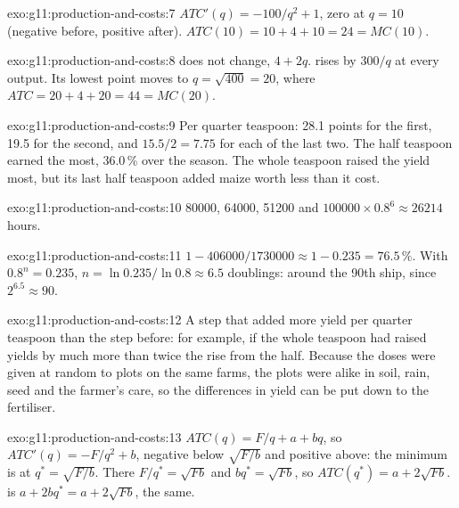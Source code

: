 \begin{solution}{exo:g11:production-and-costs:7}
$\mathit{ATC}'(q) = -100/q^2 + 1$, zero at $q = 10$ (negative before, positive after). $\mathit{ATC}(10) = 10 + 4 + 10 = 24 = \mathit{MC}(10)$.
\end{solution}

\begin{solution}{exo:g11:production-and-costs:8}
 does not change, $4 + 2q$.  rises by $300/q$ at every output. Its lowest point moves to $q = \sqrt{400} = 20$, where $\mathit{ATC} = 20 + 4
+ 20 = 44 = \mathit{MC}(20)$.
\end{solution}

\begin{solution}{exo:g11:production-and-costs:9}
Per quarter teaspoon: 28.1 points for the first, 19.5 for the second, and $15.5/2 = 7.75$ for each of the last two. The half teaspoon earned the most, 36.0\,\% over the
season. The whole teaspoon raised the yield most, but its last half teaspoon added maize worth less than it cost.
\end{solution}

\begin{solution}{exo:g11:production-and-costs:10}
\num{80000}, \num{64000}, \num{51200} and $100000 \times 0.8^6 \approx \num{26214}$ hours.
\end{solution}

\begin{solution}{exo:g11:production-and-costs:11}
$1 - 406000/1730000 \approx 1 - 0.235 = 76.5\,\%$. With $0.8^n = 0.235$, $n = \ln 0.235/\ln 0.8 \approx 6.5$ doublings: around the 90th ship, since $2^{6.5} \approx 90$.
\end{solution}

\begin{solution}{exo:g11:production-and-costs:12}
A step that added more yield per quarter teaspoon than the step before: for example, if the whole teaspoon had raised yields by much more than twice the rise from the
half. Because the doses were given at random to plots on the same farms, the plots were alike in soil, rain, seed and the farmer's care, so the differences in yield
can be put down to the fertiliser.
\end{solution}

\begin{solution}{exo:g11:production-and-costs:13}
$\mathit{ATC}(q) = F/q + a + bq$, so $\mathit{ATC}'(q) = -F/q^2 + b$, negative below $\sqrt{F/b}$ and positive above: the minimum is at $q^* = \sqrt{F/b}$. There $F/q^* =
\sqrt{Fb}$ and $bq^* = \sqrt{Fb}$, so $\mathit{ATC}(q^*) = a + 2\sqrt{Fb}$.  is $a + 2bq^* = a + 2\sqrt{Fb}$, the same.
\end{solution}

